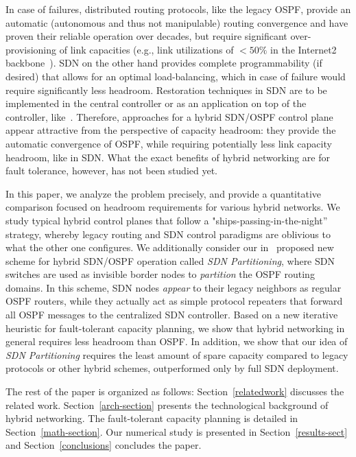 \documentclass[10pt, conference]{IEEEtran}
\begin{document}
\par In case of failures, distributed routing protocols, like the legacy OSPF, provide an automatic (autonomous and thus not manipulable) routing convergence and have proven their reliable operation over decades, but require significant over-provisioning of link capacities (e.g., link utilizations of $<50\%$ in the Internet2 backbone~\cite{internet2}). SDN on the other hand provides complete programmability (if desired) that allows for an optimal load-balancing, which in case of failure would require significantly less headroom. Restoration techniques in SDN are to be implemented in the central controller or as an application on top of the controller, like~\cite{ciena-protect}. Therefore, approaches for a hybrid SDN/OSPF control plane appear attractive from the perspective of capacity headroom: they provide the automatic convergence of OSPF, while requiring potentially less link capacity headroom, like in SDN. What the exact benefits of hybrid networking are for fault tolerance, however, has not been studied yet.

\par In this paper, we analyze the problem precisely, and provide a quantitative comparison focused on headroom requirements for various hybrid networks.  We study typical hybrid control planes that follow a "ships-passing-in-the-night'' strategy, whereby legacy routing and SDN control paradigms are oblivious to what the other one configures. We additionally consider our in~\cite{divideandconquer} proposed new scheme for hybrid SDN/OSPF operation called \emph{SDN Partitioning}, where SDN switches are used as invisible border nodes to \emph{partition} the OSPF routing domains. In this scheme, SDN nodes \emph{appear} to their legacy neighbors as regular OSPF routers, while they actually act as simple protocol repeaters that forward all OSPF messages to the centralized SDN controller. Based on a new iterative heuristic for fault-tolerant capacity planning, we show that hybrid networking in general requires less headroom than OSPF. In addition, we show that our idea of \emph{SDN Partitioning} requires the least amount of spare capacity compared to legacy protocols or other hybrid schemes, outperformed only by full SDN deployment.

\par The rest of the paper is organized as follows: Section~\ref{relatedwork} discusses the related work. Section~\ref{arch-section} presents the technological background of hybrid networking. The fault-tolerant capacity planning is detailed in Section~\ref{math-section}. Our numerical study is presented in Section~\ref{results-sect} and Section~\ref{conclusions} concludes the paper. 
\end{document}
